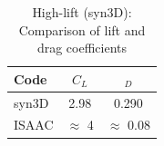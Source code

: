\begin{table}
    \centering
    \caption{High-lift (syn3D): Comparison of lift and drag coefficients}
    \label{tab:highld}
    \begin{tabular}{l cc}
        \toprule
        Code & $C_L$ & $_D$ \\
        \midrule
        syn3D & 2.98 & 0.290\\
        ISAAC & $\approx$ 4 & $\approx$ 0.08\\
        \bottomrule
    \end{tabular}
\end{table}
